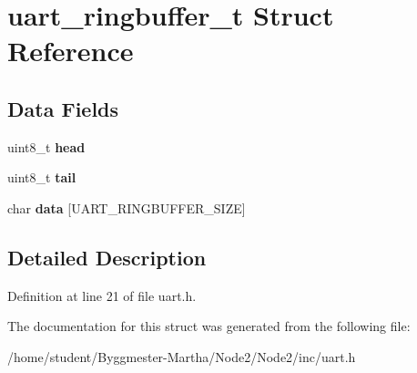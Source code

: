 \hypertarget{structuart__ringbuffer__t}{}\section{uart\+\_\+ringbuffer\+\_\+t Struct Reference}
\label{structuart__ringbuffer__t}
\subsection*{Data Fields}
\begin{DoxyCompactItemize}
\item 
\mbox{\label{structuart__ringbuffer__t_a7dd7fa4d420260e3f6f2877f5dc3b19c}} 
uint8\+\_\+t {\bfseries head}
\item 
\mbox{\label{structuart__ringbuffer__t_ae05eece4d220073e4716fbd8497210ea}} 
uint8\+\_\+t {\bfseries tail}
\item 
\mbox{\label{structuart__ringbuffer__t_a036b2ac125481cf61db7f749a1a2f11a}} 
char {\bfseries data} \mbox{[}U\+A\+R\+T\+\_\+\+R\+I\+N\+G\+B\+U\+F\+F\+E\+R\+\_\+\+S\+I\+ZE\mbox{]}
\end{DoxyCompactItemize}


\subsection{Detailed Description}


Definition at line 21 of file uart.\+h.



The documentation for this struct was generated from the following file\+:\begin{DoxyCompactItemize}
\item 
/home/student/\+Byggmester-\/\+Martha/\+Node2/\+Node2/inc/uart.\+h\end{DoxyCompactItemize}
